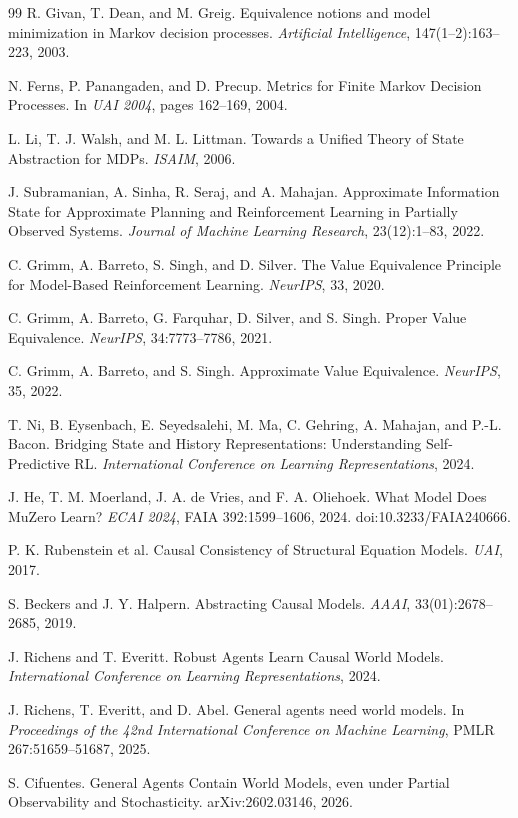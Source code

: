 \documentclass[10pt]{article}
\begin{document}
\begin{thebibliography}{99}
R. Givan, T. Dean, and M. Greig.
Equivalence notions and model minimization in Markov decision processes.
\emph{Artificial Intelligence}, 147(1--2):163--223, 2003.

N. Ferns, P. Panangaden, and D. Precup.
Metrics for Finite Markov Decision Processes.
In \emph{UAI 2004}, pages 162--169, 2004.

L. Li, T. J. Walsh, and M. L. Littman.
Towards a Unified Theory of State Abstraction for MDPs.
\emph{ISAIM}, 2006.

J. Subramanian, A. Sinha, R. Seraj, and A. Mahajan.
Approximate Information State for Approximate Planning and Reinforcement Learning in Partially Observed Systems.
\emph{Journal of Machine Learning Research}, 23(12):1--83, 2022.

C. Grimm, A. Barreto, S. Singh, and D. Silver.
The Value Equivalence Principle for Model-Based Reinforcement Learning.
\emph{NeurIPS}, 33, 2020.

C. Grimm, A. Barreto, G. Farquhar, D. Silver, and S. Singh.
Proper Value Equivalence.
\emph{NeurIPS}, 34:7773--7786, 2021.

C. Grimm, A. Barreto, and S. Singh.
Approximate Value Equivalence.
\emph{NeurIPS}, 35, 2022.

T. Ni, B. Eysenbach, E. Seyedsalehi, M. Ma, C. Gehring, A. Mahajan, and P.-L. Bacon.
Bridging State and History Representations: Understanding Self-Predictive RL.
\emph{International Conference on Learning Representations}, 2024.

J. He, T. M. Moerland, J. A. de Vries, and F. A. Oliehoek.
What Model Does MuZero Learn?
\emph{ECAI 2024}, FAIA 392:1599--1606, 2024.
doi:10.3233/FAIA240666.

P. K. Rubenstein et al.
Causal Consistency of Structural Equation Models.
\emph{UAI}, 2017.

S. Beckers and J. Y. Halpern.
Abstracting Causal Models.
\emph{AAAI}, 33(01):2678--2685, 2019.

J. Richens and T. Everitt.
Robust Agents Learn Causal World Models.
\emph{International Conference on Learning Representations}, 2024.

J. Richens, T. Everitt, and D. Abel.
General agents need world models.
In \emph{Proceedings of the 42nd International Conference on Machine Learning}, PMLR 267:51659--51687, 2025.

S. Cifuentes.
General Agents Contain World Models, even under Partial Observability and Stochasticity.
arXiv:2602.03146, 2026.

\end{thebibliography}
\end{document}
